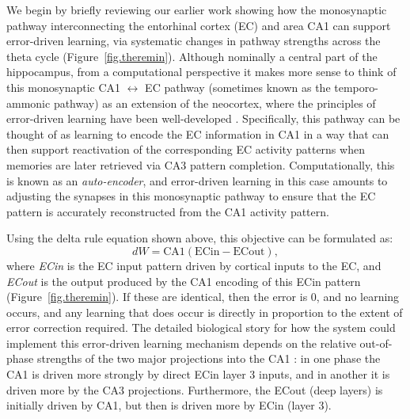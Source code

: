 \documentclass[11pt,twoside]{article}
\newif\myifpdf
\begin{document}
We begin by briefly reviewing our earlier work showing how the monosynaptic pathway interconnecting the entorhinal cortex (EC) and area CA1 can support error-driven learning, via systematic changes in pathway strengths across the theta cycle \citep{KetzMorkondaOReilly13,HasselmoBodelonWyble02} (Figure~\ref{fig.theremin}).  Although nominally a central part of the hippocampus, from a computational perspective it makes more sense to think of this monosynaptic CA1 $\leftrightarrow$ EC pathway (sometimes known as the temporo-ammonic pathway) as an extension of the neocortex, where the principles of error-driven learning have been well-developed \citep{OReilly96,WhittingtonBogacz19,LillicrapSantoroMarrisEtAl20}.  Specifically, this pathway can be thought of as learning to encode the EC information in CA1 in a way that can then support reactivation of the corresponding EC activity patterns when memories are later retrieved via CA3 pattern completion.  Computationally, this is known as an \emph{auto-encoder}, and error-driven learning in this case amounts to adjusting the synapses in this monosynaptic pathway to ensure that the EC pattern is accurately reconstructed from the CA1 activity pattern.

Using the delta rule equation shown above, this objective can be formulated as:
\begin{equation}    
dW = \mbox{CA1} (\mbox{ECin} - \mbox{ECout}),
\end{equation}
where \emph{ECin} is the EC input pattern driven by cortical inputs to the EC, and \emph{ECout} is the output produced by the CA1 encoding of this ECin pattern (Figure~\ref{fig.theremin}).  If these are identical, then the error is 0, and no learning occurs, and any learning that does occur is directly in proportion to the extent of error correction required.  The detailed biological story for how the system could implement this error-driven learning mechanism depends on the relative out-of-phase strengths of the two major projections into the CA1 \citep{HasselmoBodelonWyble02}: in one phase the CA1 is driven more strongly by direct ECin layer 3 inputs, and in another it is driven more by the CA3 projections.  Furthermore, the ECout (deep layers) is initially driven by CA1, but then is driven more by ECin (layer 3).
\end{document}
